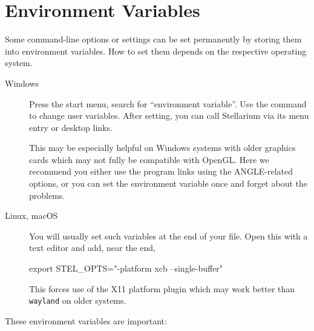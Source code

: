 %



\section{Environment Variables}
\label{sec:Environment}

Some command-line options or settings can be set permanently by storing them into
environment variables. How to set them depends on the respective
operating system. 

\begin{description}
\item[Windows]
Press the start menu, search for ``environment variable''. Use the command to change user variables. 
After setting, you can call Stellarium via its menu entry or desktop links. 

This may be especially helpful on Windows systems with older graphics
cards which may not fully be compatible with OpenGL. Here we recommend
you either use the program links using the ANGLE-related options, or
you can set the environment variable once and forget about the
problems.

\item[Linux, macOS]
You will usually set such variables at the end of your  file. 
Open this with a text editor and add, near the end, 
\begin{configfile}
export STEL_OPTS="-platform xcb --single-buffer"
\end{configfile}
This forces use of the X11 platform plugin which may work better than \texttt{wayland} on older systems.
\end{description}


\noindent These environment variables are important:

